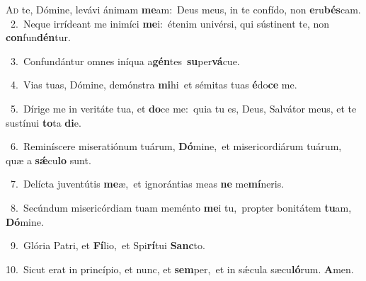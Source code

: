 \lettrine{\initial\textcolor{\initialcolor}{A}}{d} te, Dómine, levávi ánimam \textbf{me}\-am:~\star Deus meus, in te confído, non \textbf{e}\-ru\-\textbf{bés}\-cam.\\
{\numbfont\textcolor{\numbcolor}{~2.}}~Neque irrídeant me inimíci \textbf{me}\-i:~\star étenim univérsi, qui sústinent te, non \textbf{con}\-fun\-\textbf{dén}\-tur.\par
{\numbfont\textcolor{\numbcolor}{~3.}}~Confundántur omnes iníqua a\-\textbf{gén}\-tes~\star \textbf{su}\-per\-\textbf{vá}\-cue.\par
{\numbfont\textcolor{\numbcolor}{~4.}}~Vias tuas, Dómine, demónstra \textbf{mi}\-hi~\star et sémitas tuas \textbf{é}\-do\textbf{ce} me.\par
{\numbfont\textcolor{\numbcolor}{~5.}}~Dírige me in veritáte tua, et \textbf{do}\-ce me:~\star quia tu es, Deus, Salvátor meus, et te sustínui \textbf{to}\-ta \textbf{di}\-e.\par
{\numbfont\textcolor{\numbcolor}{~6.}}~Reminíscere miseratiónum tuárum, \textbf{Dó}\-mine,~\star et misericordiárum tuárum, quæ a \textbf{sǽ}\-cu\textbf{lo} sunt.\par
{\numbfont\textcolor{\numbcolor}{~7.}}~Delícta juventútis \textbf{me}\-æ,~\star et ignorántias meas \textbf{ne} me\-\textbf{mí}\-neris.\par
{\numbfont\textcolor{\numbcolor}{~8.}}~Secúndum misericórdiam tuam meménto \textbf{me}\-i tu,~\star propter bonitátem \textbf{tu}\-am, \textbf{Dó}\-mine.\par
{\numbfont\textcolor{\numbcolor}{~9.}}~Glória Patri, et \textbf{Fí}\-lio,~\star et Spi\-\textbf{rí}\-tui \textbf{Sanc}\-to.\par
{\numbfont\textcolor{\numbcolor}{10.}}~Sicut erat in princípio, et nunc, et \textbf{sem}\-per,~\star et in sǽcula sæcu\-\textbf{ló}\-rum. \textbf{A}\-men.\par
